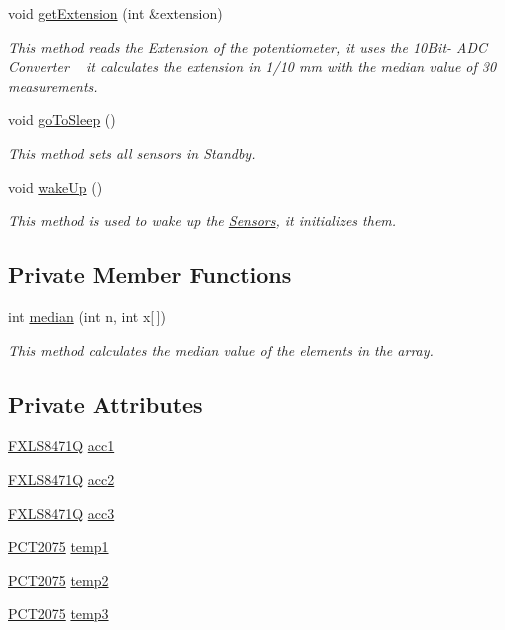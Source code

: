 \begin{DoxyCompactItemize}
void \hyperlink{class_sensors_a91a5ade4211864240cadf8b5c76cdab5}{get\+Extension} (int \&extension)
\begin{DoxyCompactList}\small\item\em This method reads the Extension of the potentiometer, it uses the 10\+Bit-\/ A\+DC Converter ~\newline
it calculates the extension in 1/10 mm with the median value of 30 measurements. \end{DoxyCompactList}\item 
void \hyperlink{class_sensors_a3bc6596e2f0dd4fb8dc62dd3088fef08}{go\+To\+Sleep} ()
\begin{DoxyCompactList}\small\item\em This method sets all sensors in Standby. \end{DoxyCompactList}\item 
void \hyperlink{class_sensors_af41ecbcaba9f0b7584f6db4167c675b7}{wake\+Up} ()
\begin{DoxyCompactList}\small\item\em This method is used to wake up the \hyperlink{class_sensors}{Sensors}, it initializes them. \end{DoxyCompactList}\end{DoxyCompactItemize}
\subsection*{Private Member Functions}
\begin{DoxyCompactItemize}
\item 
int \hyperlink{class_sensors_ad6f32987563a60281c980a6fa6c5ec16}{median} (int n, int x\mbox{[}$\,$\mbox{]})
\begin{DoxyCompactList}\small\item\em This method calculates the median value of the elements in the array. \end{DoxyCompactList}\end{DoxyCompactItemize}
\subsection*{Private Attributes}
\begin{DoxyCompactItemize}
\item 
\hyperlink{class_f_x_l_s8471_q}{F\+X\+L\+S8471Q} \hyperlink{class_sensors_ac0f59bed5fff02ea6ac23f2cef86fc30}{acc1}
\item 
\hyperlink{class_f_x_l_s8471_q}{F\+X\+L\+S8471Q} \hyperlink{class_sensors_a9170ea284aa665a822ec2cf8fc9fefdf}{acc2}
\item 
\hyperlink{class_f_x_l_s8471_q}{F\+X\+L\+S8471Q} \hyperlink{class_sensors_afd2385d76c20609170ace022a945edfa}{acc3}
\item 
\hyperlink{class_p_c_t2075}{P\+C\+T2075} \hyperlink{class_sensors_abf16d9fc6440651f552d24d91090cb7f}{temp1}
\item 
\hyperlink{class_p_c_t2075}{P\+C\+T2075} \hyperlink{class_sensors_a3ef4e3befd4b22c61900ee9b589511f0}{temp2}
\item 
\hyperlink{class_p_c_t2075}{P\+C\+T2075} \hyperlink{class_sensors_a6019e66b1f8a52d0f4768d4a928df3d0}{temp3}
\end{DoxyCompactItemize}


